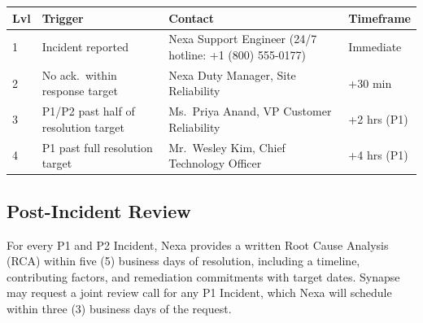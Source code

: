\vspace{4pt}
\begin{tabularx}{\linewidth}{@{} C{0.9cm} L{2.9cm} X C{1.9cm} @{}}
  \toprule
  \textbf{Lvl} & \textbf{Trigger} & \textbf{Contact} & \textbf{Timeframe} \\
   & Incident reported &
    Nexa Support Engineer (24/7 hotline: +1 (800) 555-0177) &
    Immediate \\
  2 & No ack.\ within response target &
    Nexa Duty Manager, Site Reliability &
    +30 min \\
  3 & P1/P2 past half of resolution target &
    Ms.\ Priya Anand, VP Customer Reliability &
    +2 hrs (P1) \\
  4 & P1 past full resolution target &
    Mr.\ Wesley Kim, Chief Technology Officer &
    +4 hrs (P1) \\
  \bottomrule
\end{tabularx}
\label{tab:escalation}

\subsection{Post-Incident Review}

For every P1 and P2 Incident, Nexa provides a written Root Cause Analysis (RCA) within
five (5) business days of resolution, including a timeline, contributing factors, and
remediation commitments with target dates. Synapse may request a joint review call for
any P1 Incident, which Nexa will schedule within three (3) business days of the request.
